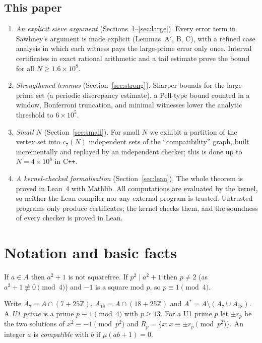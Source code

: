 \documentclass[11pt]{amsart}
\theoremstyle{definition}
\theoremstyle{remark}
\newcommand{\Z}{\mathbb{Z}}
\begin{document}
\subsection*{This paper}
\begin{enumerate}[leftmargin=*]
\item \emph{An explicit sieve argument} (Sections~\ref{sec:notation}--\ref{sec:large}).
  Every error term in Sawhney's argument is made explicit (Lemmas~A$'$, B, C), with a
  refined case analysis in which each witness pays the large-prime error only once.
  Interval certificates in exact rational arithmetic and a tail estimate prove the
  bound for all $N\ge1.6\times10^8$.
\item \emph{Strengthened lemmas} (Section~\ref{sec:strong}). Sharper bounds for the
  large-prime set (a periodic discrepancy estimate), a Pell-type bound counted in a
  window, Bonferroni truncation, and minimal witnesses lower the analytic threshold
  to $6\times10^5$.
\item \emph{Small $N$} (Section~\ref{sec:small}). For small $N$ we exhibit a
  partition of the vertex set into $c_7(N)$ independent sets of the
  ``compatibility'' graph, built incrementally and replayed by an independent
  checker; this is done up to $N=4\times10^8$ in C\texttt{++}.
\item \emph{A kernel-checked formalisation} (Section~\ref{sec:lean}). The whole
  theorem is proved in Lean~4 with Mathlib. All computations are evaluated by the
  kernel, so neither the Lean compiler nor any external program is trusted.
  Untrusted programs only produce certificates; the kernel checks them, and the
  soundness of every checker is proved in Lean.
\end{enumerate}

\section{Notation and basic facts}\label{sec:notation}

If $a\in A$ then $a^2+1$ is not squarefree. If $p^2\mid a^2+1$ then $p\ne2$ (as
$a^2+1\not\equiv0\pmod4$) and $-1$ is a square mod $p$, so $p\equiv1\pmod4$.

Write $A_7=A\cap(7+25\Z)$, $A_{18}=A\cap(18+25\Z)$ and
$A^*=A\setminus(A_7\cup A_{18})$. A \emph{U1 prime} is a prime $p\equiv1\pmod4$
with $p\ge13$. For a U1 prime $p$ let $\pm r_p$ be the two solutions of
$x^2\equiv-1\pmod{p^2}$ and $R_p=\{x: x\equiv\pm r_p\pmod{p^2}\}$. An integer $a$
is \emph{compatible} with $b$ if $\mu(ab+1)=0$.
\end{document}
